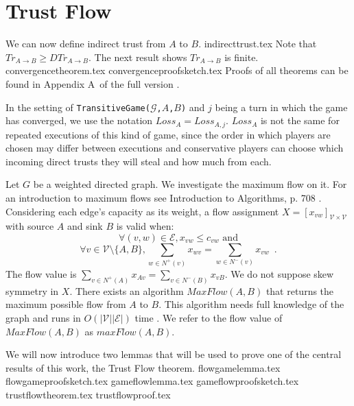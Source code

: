 \section{Trust Flow}
  We can now define indirect trust from $A$ to $B$.
  {indirecttrust.tex}
  \noindent Note that $Tr_{A \rightarrow B} \geq DTr_{A \rightarrow B}$. The next result shows $Tr_{A \rightarrow B}$ is
  finite.
  {convergencetheorem.tex}
  {convergenceproofsketch.tex}
  Proofs of all theorems can be found in Appendix A\ifdefined\proceedings \ of the full version \cite{trustisrisk}\fi.

  In the setting of \texttt{TransitiveGame(}$\mathcal{G}$\texttt{,}$A$\texttt{,}$B$\texttt{)} and $j$ being a turn in which
  the game has converged, we use the notation $Loss_A = Loss_{A, j}$. $Loss_A$ is not the same for repeated executions of this
  kind of game, since the order in which players are chosen may differ between executions and conservative players can choose
  which incoming direct trusts they will steal and how much from each.

  Let $G$ be a weighted directed graph. We investigate the maximum flow on it. For an introduction to maximum
  flows see Introduction to Algorithms, p. 708 \cite{clrs}. Considering each edge's capacity as its weight, a flow
  assignment $X = [x_{vw}]_{\mathcal{V} \times \mathcal{V}}$ with source $A$ and sink $B$ is valid when:
  \begin{equation}
  \label{flow1}
    \forall (v, w) \in \mathcal{E}, x_{vw} \leq c_{vw} \mbox{ and}
  \end{equation}
  \begin{equation}
  \label{flow2}
    \forall v \in \mathcal{V} \setminus \{A,B\}, \sum\limits_{w \in N^{+}(v)}x_{wv} = \sum\limits_{w \in N^{-}(v)}x_{vw}
    \enspace.
  \end{equation}
  The flow value is $\sum\limits_{v \in N^{+}\left(A\right)}x_{Av} = \sum\limits_{v \in N^{-}\left(B\right)}x_{vB}$. We do not
  suppose skew symmetry in $X$. There exists an algorithm $MaxFlow\left(A, B\right)$ that returns the maximum possible flow
  from $A$ to $B$.  This algorithm needs full knowledge of the graph and runs in $O\left(|\mathcal{V}||\mathcal{E}|\right)$
  time \cite{maxflownm}. We refer to the flow value of $MaxFlow\left(A, B\right)$ as $maxFlow\left(A, B\right)$.

  We will now introduce two lemmas that will be used to prove one of the central results of this work, the Trust Flow
  theorem.
  {flowgamelemma.tex}
  {flowgameproofsketch.tex}
  {gameflowlemma.tex}
  {gameflowproofsketch.tex}
  {trustflowtheorem.tex}
  {trustflowproof.tex}

